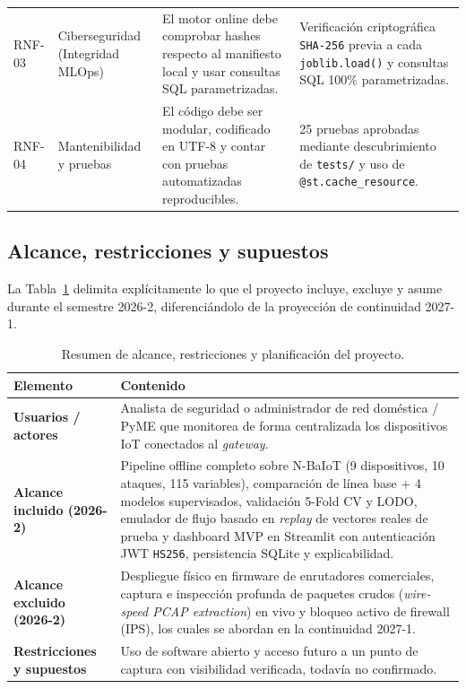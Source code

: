 \documentclass[11pt,a4paper]{article}
\begin{document}
\begin{table}[H]
\begin{tabularx}{\textwidth}{p{1.2cm} p{2.2cm} X p{4.2cm}}
RNF-03 & Ciberseguridad (Integridad MLOps) & El motor online debe comprobar hashes respecto al manifiesto local y usar consultas SQL parametrizadas. & Verificación criptográfica \texttt{SHA-256} previa a cada \texttt{joblib.load()} y consultas SQL 100\% parametrizadas. \\
RNF-04 & Mantenibilidad y pruebas & El código debe ser modular, codificado en UTF-8 y contar con pruebas automatizadas reproducibles. & 25 pruebas aprobadas mediante descubrimiento de \texttt{tests/} y uso de \texttt{@st.cache\_resource}. \\
\bottomrule
\end{tabularx}
\end{table}

\subsection{Alcance, restricciones y supuestos}
La Tabla~\ref{tab:alcance} delimita explícitamente lo que el proyecto incluye, excluye y asume durante el semestre 2026-2, diferenciándolo de la proyección de continuidad 2027-1.

\begin{table}[H]
\centering
\caption{Resumen de alcance, restricciones y planificación del proyecto.}
\label{tab:alcance}
\small
\begin{tabularx}{\textwidth}{>{\bfseries}p{}X}
\toprule
Elemento & Contenido \\
\midrule
Usuarios / actores & Analista de seguridad o administrador de red doméstica / PyME que monitorea de forma centralizada los dispositivos IoT conectados al \textit{gateway}. \\
Alcance incluido (2026-2) & Pipeline offline completo sobre N-BaIoT (9 dispositivos, 10 ataques, 115 variables), comparación de línea base + 4 modelos supervisados, validación 5-Fold CV y LODO, emulador de flujo basado en \textit{replay} de vectores reales de prueba y dashboard MVP en Streamlit con autenticación JWT \texttt{HS256}, persistencia SQLite y explicabilidad. \\
Alcance excluido (2026-2) & Despliegue físico en firmware de enrutadores comerciales, captura e inspección profunda de paquetes crudos (\textit{wire-speed PCAP extraction}) en vivo y bloqueo activo de firewall (IPS), los cuales se abordan en la continuidad 2027-1. \\
Restricciones y supuestos & Uso de software abierto y acceso futuro a un punto de captura con visibilidad verificada, todavía no confirmado. \\
\bottomrule
\end{tabularx}
\end{table}
\end{document}
